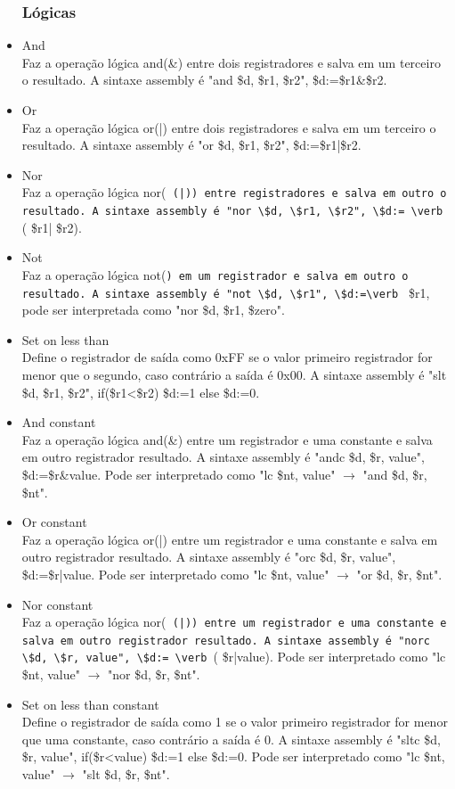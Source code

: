 \documentclass[a4paper, 10pt]{article}
\begin{document}
\begin{itemize}
	\subsubsection{Lógicas}
	\item And\\
	Faz a operação lógica and(\&) entre dois registradores e salva em um terceiro o resultado. A sintaxe assembly é "and \$d, \$r1, \$r2", \$d:=\$r1\&\$r2.
	\item Or\\
	Faz a operação lógica or(|) entre dois registradores e salva em um terceiro o resultado. A sintaxe assembly é "or \$d, \$r1, \$r2", \$d:=\$r1|\$r2.
	\item Nor\\
	Faz a operação lógica nor(\verb ~ (|)) entre registradores e salva em outro o resultado. A sintaxe assembly é "nor \$d, \$r1, \$r2", \$d:= \verb ~( \$r1| \$r2).
	\item Not\\
	Faz a operação lógica not(\verb ~) em um registrador e salva em outro o resultado. A sintaxe assembly é "not \$d, \$r1", \$d:=\verb ~ \$r1, pode ser interpretada como "nor \$d, \$r1, \$zero".
	\item Set on less than\\
	Define o registrador de saída como 0xFF se o valor primeiro registrador for menor que o segundo, caso contrário a saída é 0x00. A sintaxe assembly é "slt \$d, \$r1, \$r2", if(\$r1<\$r2) \$d:=1 else \$d:=0.
	\item And constant\\
	Faz a operação lógica and(\&) entre um registrador e uma constante e salva em outro registrador resultado. A sintaxe assembly é "andc \$d, \$r, value", \$d:=\$r\&value. Pode ser interpretado como "lc \$nt, value" $\rightarrow$ "and \$d, \$r, \$nt".
	\item Or constant\\
	Faz a operação lógica or(|) entre um registrador e uma constante e salva em outro registrador resultado. A sintaxe assembly é "orc \$d, \$r, value", \$d:=\$r|value. Pode ser interpretado como "lc \$nt, value" $\rightarrow$ "or \$d, \$r, \$nt".
	\item Nor constant\\
	Faz a operação lógica nor(\verb ~ (|)) entre um registrador e uma constante e salva em outro registrador resultado. A sintaxe assembly é "norc \$d, \$r, value", \$d:= \verb ~( \$r|value). Pode ser interpretado como "lc \$nt, value" $\rightarrow$ "nor \$d, \$r, \$nt".
	\item Set on less than constant\\
	Define o registrador de saída como 1 se o valor primeiro registrador for menor que uma constante, caso contrário a saída é 0. A sintaxe assembly é "sltc \$d, \$r, value", if(\$r<value) \$d:=1 else \$d:=0. Pode ser interpretado como "lc \$nt, value" $\rightarrow$ "slt \$d, \$r, \$nt".

\end{itemize}
\end{document}
